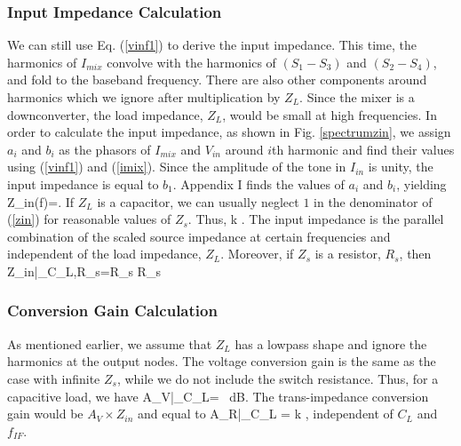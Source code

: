 \subsubsection{Input Impedance Calculation} 
We can still use Eq. (\ref{vinf1}) to derive the input impedance. This time, the harmonics of $I_{mix}$ convolve with the harmonics of
$(S_1-S_3)$ and $(S_2-S_4)$, and fold to the baseband frequency. There are also other components around harmonics which we ignore after multiplication
by $Z_L$. Since the mixer is a downconverter, the load impedance, $Z_L$, would be small at high frequencies. In order to calculate the input
impedance, as shown in Fig. \ref{spectrumzin}, we assign $a_i$ and $b_i$ as the phasors of $I_{mix}$ and $V_{in}$ around $i$th harmonic and find their
values using (\ref{vinf1}) and (\ref{imix}). Since the amplitude of the tone in $I_{in}$ is unity, the input impedance is equal to $b_1$. Appendix I
finds the values of $a_i$ and $b_i$, yielding
\beq
Z_{in}(f)=.
\label{zin}
\eeq
If $Z_L$ is a capacitor, we can usually neglect $1$ in the denominator of (\ref{zin}) for reasonable values of $Z_s$. Thus,
\beq
{} \approx \SumAll k .
\label{zinc}
\eeq
The input impedance is the parallel combination of the scaled source impedance at certain frequencies and independent of the load impedance, $Z_L$.
Moreover, if $Z_s$ is a resistor, $R_s$, then 
\beq
Z_{in}|_{C_L,R_s}=R_s  R_s
\label{zincr}
\eeq


\subsubsection{Conversion Gain Calculation}
As mentioned earlier, we assume that $Z_L$ has a lowpass shape and ignore the harmonics at the output nodes.
The voltage conversion gain is the same as the case with infinite $Z_s$, while we do not include the switch resistance. Thus, for a capacitive load,
we have
\beq
A_V|_{C_L}=  ~{\rm dB}.
\label{avinc}
\eeq
The trans-impedance conversion gain would be $A_V \times Z_{in}$ and equal to
\beq
A_R|_{C_L} =  \div \SumAll k ,
\label{arinc}
\eeq
independent of $C_L$ and $f_{IF}$.


